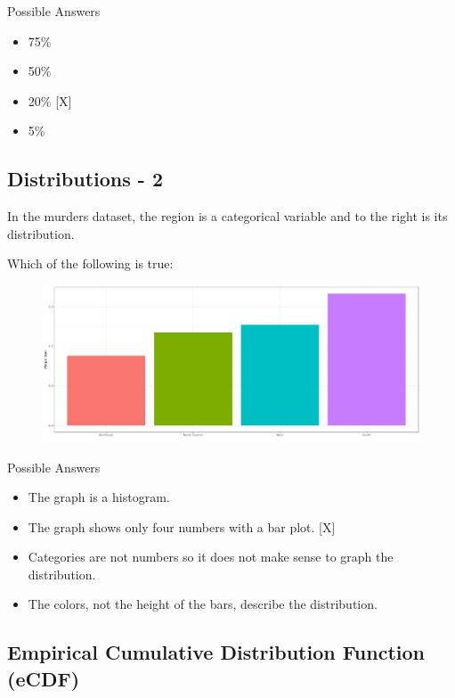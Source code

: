 \documentclass[]{article}
\providecommand{\tightlist}{%
  \setlength{\itemsep}{0pt}\setlength{\parskip}{0pt}}
\begin{document}
Possible Answers

\begin{itemize}
\tightlist
\item
  75\%
\item
  50\%
\item
  20\% {[}X{]}
\item
  5\%
\end{itemize}

\subsection{\texorpdfstring{\textbf{Distributions -
2}}{Distributions - 2}}\label{distributions---2}

In the murders dataset, the region is a categorical variable and to the
right is its distribution.

Which of the following is true:

\begin{figure}
\centering
\includegraphics{img1.png}
\caption{}
\end{figure}

Possible Answers

\begin{itemize}
\tightlist
\item
  The graph is a histogram.
\item
  The graph shows only four numbers with a bar plot. {[}X{]}
\item
  Categories are not numbers so it does not make sense to graph the
  distribution.
\item
  The colors, not the height of the bars, describe the distribution.
\end{itemize}

\subsection{\texorpdfstring{\textbf{Empirical Cumulative Distribution
Function
(eCDF)}}{Empirical Cumulative Distribution Function (eCDF)}}\label{empirical-cumulative-distribution-function-ecdf}
\end{document}
